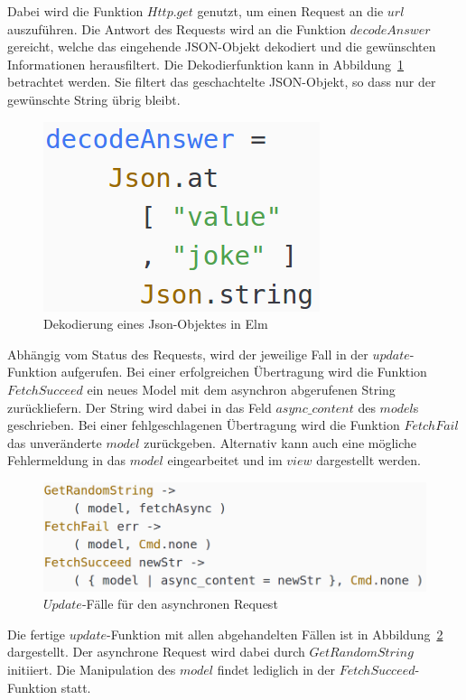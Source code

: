 Dabei wird die Funktion $Http.get$ genutzt, um einen Request an die $url$ auszuführen. Die Antwort des Requests wird an die Funktion $decodeAnswer$ gereicht, welche das eingehende \ac{JSON}-Objekt dekodiert und die gewünschten Informationen herausfiltert. Die Dekodierfunktion kann in Abbildung~\ref{fig:decodeanswer-async} betrachtet werden. Sie filtert das geschachtelte \ac{JSON}-Objekt, so dass nur der gewünschte String übrig bleibt.
\begin{figure}[h]
\centering
\includegraphics[scale=0.4]{img/decodeanswer-async.png}
\caption{Dekodierung eines Json-Objektes in Elm}\label{fig:decodeanswer-async}
\end{figure}
Abhängig vom Status des Requests, wird der jeweilige Fall in der $update$-Funktion aufgerufen. Bei einer erfolgreichen Übertragung wird die Funktion $FetchSucceed$ ein neues Model mit dem asynchron abgerufenen String zurückliefern. Der String wird dabei in das Feld $async\_content$ des $model$s geschrieben. Bei einer fehlgeschlagenen Übertragung wird die Funktion $FetchFail$ das unveränderte $model$ zurückgeben. Alternativ kann auch eine mögliche Fehlermeldung in das $model$ eingearbeitet und im $view$ dargestellt werden.
\begin{figure}[h]
\centering
\includegraphics[scale=0.4]{img/update-async.png}
\caption{$Update$-Fälle für den asynchronen Request}\label{fig:update-async}
\end{figure}
Die fertige $update$-Funktion mit allen abgehandelten Fällen ist in Abbildung~\ref{fig:update-async} dargestellt. Der asynchrone Request wird dabei durch $GetRandomString$ initiiert. Die Manipulation des $model$ findet lediglich in der $FetchSucceed$-Funktion statt.
